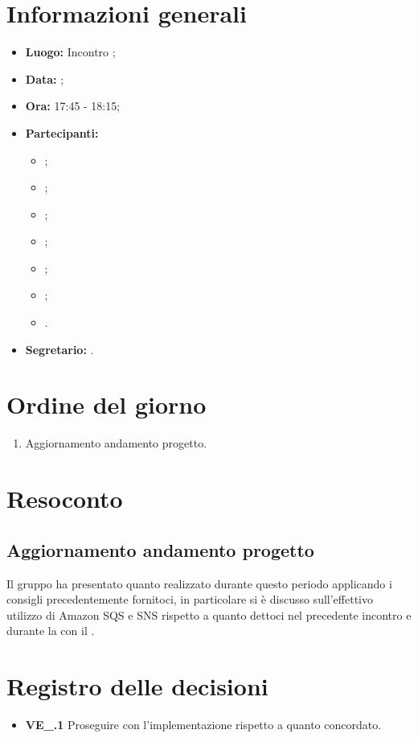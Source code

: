 \section{Informazioni generali}
\begin{itemize}
\item \textbf{Luogo:} Incontro ;
\item \textbf{Data:} \Data;
\item \textbf{Ora:} 17:45 - 18:15;
\item \textbf{Partecipanti:}
	\begin{itemize}
		\item \BL{}; 
		\item \FF{};
		\item \MM{};
		\item \PC{};
		\item \TG{};
		\item \TL{};
		\item \Proponente{}.
	\end{itemize}
\item \textbf{Segretario:} \MM{}.
\end{itemize}

\section{Ordine del giorno}
\begin{enumerate}
	\item Aggiornamento andamento progetto.
\end{enumerate}

\section{Resoconto}
\subsection{Aggiornamento andamento progetto}
Il gruppo ha presentato quanto realizzato durante questo periodo applicando i consigli precedentemente fornitoci, in particolare si è discusso sull'effettivo utilizzo di Amazon SQS e SNS rispetto a quanto dettoci nel precedente incontro e durante la  con il \CR.

\section{Registro delle decisioni}
\begin{itemize}
	\item \textbf{VE\_\Data.1} Proseguire con l'implementazione rispetto a quanto concordato.
\end{itemize}
